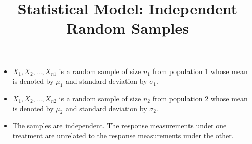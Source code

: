 \documentclass{article}
\begin{document}
\begin{mdframed}
\title{Statistical Model: Independent Random Samples}
\begin{itemize}
    \item \(X_1, X_2, ..., X_{n1}\) is a random sample of size \(n_1\) from population 1 whose mean is denoted by \(\mu_1\) and standard deviation by \(\sigma_1\).
    \item \(X_1, X_2, ..., X_{n2}\) is a random sample of size \(n_2\) from population 2 whose mean is denoted by \(\mu_2\) and standard deviation by \(\sigma_2\).
    \item The samples are independent. The response measurements under one treatment are unrelated to the response measurements under the other.
\end{itemize}
\end{mdframed}
\end{document}
